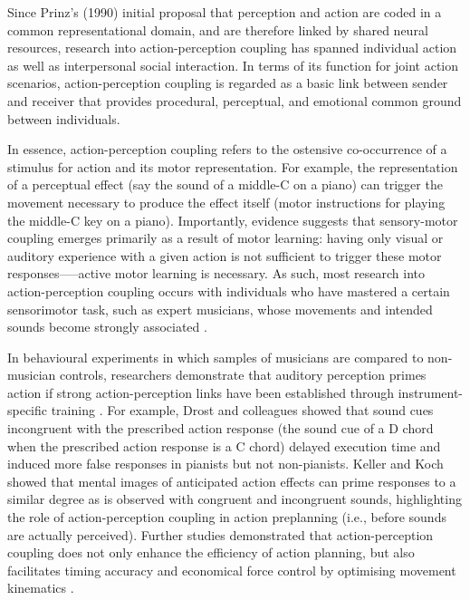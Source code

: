\begin{CJK}{UTF8}{gbsn}
Since Prinz’s (1990) initial proposal that perception and action are coded in a common representational domain, and are therefore linked by shared neural resources, research into action-perception coupling has spanned individual action as well as interpersonal social interaction.
In terms of its function for joint action scenarios, action-perception coupling is regarded as a basic link between sender and receiver \citep{Rizzolatti1998} that provides procedural, perceptual, and emotional common ground between individuals.

In essence, action-perception coupling refers to the ostensive co-occurrence of a stimulus for action and its motor representation.  For example, the representation of a perceptual effect (say the sound of a middle-C on a piano) can trigger the movement necessary to produce the effect itself (motor instructions for playing the middle-C key on a piano).   Importantly, evidence suggests that sensory-motor coupling emerges primarily as a result of motor learning: having only visual \citep{Candidi2014} or auditory \citep{Lahav2007} experience with a given action is not sufficient to trigger these motor responses—--active motor learning is necessary.  As such, most research into action-perception coupling occurs with individuals who have mastered a certain sensorimotor task, such as expert musicians, whose movements and intended sounds become strongly associated \citep{Novembre2014}.

In behavioural experiments in which samples of musicians are compared to non-musician controls, researchers demonstrate that auditory perception primes action if strong action-perception links have been established through instrument-specific training \citep{Drost2005,Drost2005a,Drost2007}.  For example, Drost and colleagues showed that sound cues incongruent with the prescribed action response (the sound cue of a D chord when the prescribed action response is a C chord) delayed execution time \citep{Drost2005} and induced more false responses \citep[i.e., production of the heard chord, instead of the imperative one,][]{Drost2005a} in pianists but not non-pianists.  Keller and Koch \textcite{Keller2006} showed that mental images of anticipated action effects can prime responses to a similar degree as is observed with congruent and incongruent sounds, highlighting the role of action-perception coupling in action preplanning (i.e., before sounds are actually perceived).  Further studies demonstrated that action-perception coupling does not only enhance the efficiency of action planning, but also facilitates timing accuracy and economical force control by optimising movement kinematics \citep{Keller2010}.


\end{CJK}
